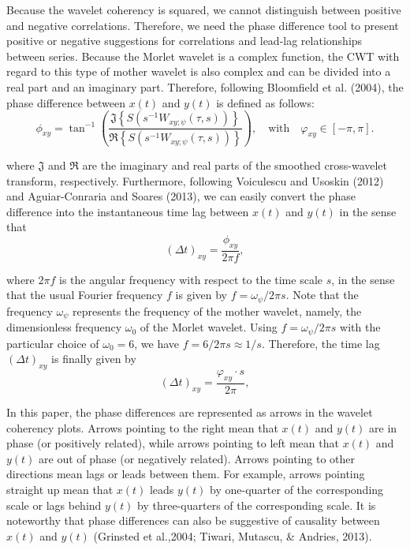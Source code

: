 \documentclass[a4paper,fleqn]{cas-sc}
\begin{document}
Because the wavelet coherency is squared, we cannot distinguish between positive and negative correlations. Therefore, we need the phase difference tool to present positive or negative suggestions for correlations and lead-lag relationships between series. Because the Morlet wavelet is a complex function, the CWT with regard to this type of mother wavelet is also complex and can be divided into a real part and an imaginary part. Therefore, following Bloomfield et al. (2004), the phase difference between $x(t)$ and $y(t)$ is defined as follows:
$$\phi_{xy}=\tan^{-1} \left(\frac{\mathfrak{J}\left\{S\left(s^{-1}W_{xy;\psi}(\tau,s)\right)\right\}}{\mathfrak{R} \left\{S\left(s^{-1}W_{xy;\psi}(\tau,s)\right)\right\}}\right),\quad \mbox{with}\quad \varphi_{xy}\in[-\pi,\pi].$$

where $\mathfrak{J}$ and $\mathfrak{R}$ are the imaginary and real parts of the smoothed cross-wavelet transform, respectively. Furthermore, following Voiculescu and Usoskin (2012) and Aguiar-Conraria and Soares (2013), we can easily convert the phase difference into the instantaneous time lag between $x(t)$ and $y(t)$ in the sense that
$$(\Delta t)_{xy}=\frac{\phi_{xy}}{2\pi f},$$

where $2\pi f$ is the angular frequency with respect to the time scale $s$, in the sense that the usual Fourier frequency $f$ is given by $f = \omega_\psi / 2\pi s$. Note that the frequency $\omega_\psi$ represents the frequency of the mother wavelet, namely, the dimensionless frequency $\omega_0$ of the Morlet wavelet. Using $f = \omega_\psi / 2\pi s$ with the particular choice of $\omega_0 = 6$, we have $f = 6/2\pi s \approx 1/s$. Therefore, the time lag $(\Delta t)_{xy}$ is finally given by
$$(\Delta t)_{xy}=\frac{\varphi_{xy}\cdot s}{2\pi},$$

In this paper, the phase differences are represented as arrows in the wavelet coherency plots. Arrows pointing to the right mean that $x(t)$ and $y(t)$ are in phase (or positively related), while arrows pointing to left mean that $x(t)$ and $y(t)$ are out of
phase (or negatively related). Arrows pointing to other directions mean lags or leads between them. For example, arrows pointing straight up mean that $x(t)$ leads $y(t)$ by one-quarter of the corresponding scale or lags behind $y(t)$ by three-quarters of the corresponding scale.  It is noteworthy that phase differences can also be suggestive of causality between $x(t)$ and $y(t)$ (Grinsted et al.,2004; Tiwari, Mutascu, \& Andries, 2013).
\end{document}
